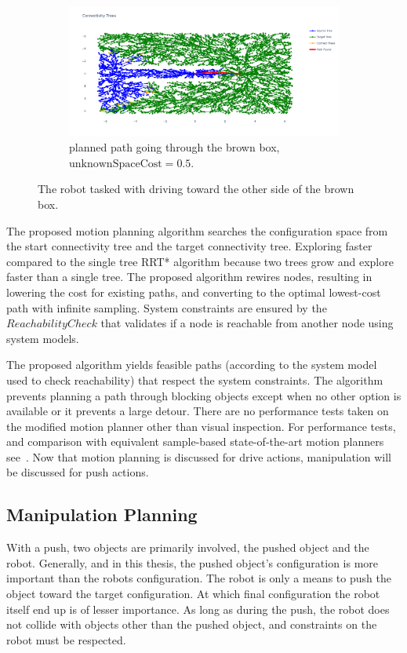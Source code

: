 \begin{figure}[H]
    \begin{subfigure}{1.11\textwidth}
    \centering
    \includegraphics[width=\textwidth]{figures/mp_low_fixed_cost}
    \caption{planned path going through the brown box, $\textrm{unknownSpaceCost} = 0.5$.}
    \end{subfigure}
    \caption{The robot tasked with driving toward the other side of the brown box.}%
    \label{fig:mp_push_or_drive}
\end{figure}

The proposed motion planning algorithm searches the configuration space from the start connectivity tree and the target connectivity tree. Exploring faster compared to the single tree \ac{RRT*} algorithm because two trees grow and explore faster than a single tree. The proposed algorithm rewires nodes, resulting in lowering the cost for existing paths, and converting to the optimal lowest-cost path with infinite sampling. System constraints are ensured by the $ReachabilityCheck$ that validates if a node is reachable from another node using system models.\bs

The proposed algorithm yields feasible paths (according to the system model used to check reachability) that respect the system constraints. The algorithm prevents planning a path through blocking objects except when no other option is available or it prevents a large detour. There are no performance tests taken on the modified motion planner other than visual inspection. For performance tests, and comparison with equivalent sample-based state-of-the-art motion planners see~\cite{chen_fast_2018}. Now that motion planning is discussed for drive actions, manipulation will be discussed for push actions.


\subsection{Manipulation Planning}%
\label{subsec:manipulation_planning}
With a push, two objects are primarily involved, the pushed object and the robot. Generally, and in this thesis, the pushed object's configuration is more important than the robots configuration. The robot is only a means to push the object toward the target configuration. At which final configuration the robot itself end up is of lesser importance. As long as during the push, the robot does not collide with objects other than the pushed object, and constraints on the robot must be respected.\bs

